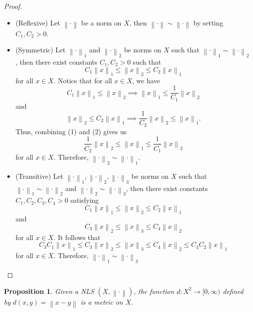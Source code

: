 \documentclass[12pt]{article}
\newtheorem*{proposition}{Proposition}
\newcommand{\lnorm}[2]{\left\lVert#2 \right\rVert_{#1}}
\newcommand{\norm}[1]{\left\lVert#1 \right\rVert}
\begin{document}
\begin{proof} \leavevmode
    \begin{itemize}
        \item (Reflexive) Let $\norm{\cdot}$ be a norm on $X$, then $\norm{\cdot} \sim \norm{\cdot}$ by setting $C_1, C_2 > 0$.
        \item (Symmetric) Let $\lnorm{1}{\cdot}$ and $\lnorm{2}{\cdot}$ be norms on $X$ such that $\lnorm{1}{\cdot} \sim \lnorm{2}{\cdot}$, then there exist constants $C_1, C_2 > 0$ such that 
        $$C_1 \lnorm{1}{x} \leq \lnorm{2}{x} \leq C_2 \lnorm{1}{x}$$
        for all $x \in X$. Notice that for all $x \in X$, we have
        \[C_1 \lnorm{1}{x} \leq \lnorm{2}{x} \implies \lnorm{1}{x} \leq \frac{1}{C_1}\lnorm{2}{x} \tag*{(1)} \]
        and 
        \[\lnorm{2}{x} \leq C_2 \lnorm{1}{x} \implies \frac{1}{C_2}\lnorm{2}{x} \leq \lnorm{1}{x}.\tag*{(2)} \]
        Thus, combining (1) and (2) gives us
        $$\frac{1}{C_2}\lnorm{2}{x} \leq \lnorm{1}{x} \leq \frac{1}{C_1}\lnorm{2}{x}$$
        for all $x \in X$. Therefore, $\lnorm{2}{\cdot} \sim \lnorm{1}{\cdot}$.
        \item (Transitive) Let $\lnorm{1}{\cdot}, \lnorm{2}{\cdot}, \lnorm{3}{\cdot}$ be norms on $X$ such that $\lnorm{1}{\cdot} \sim \lnorm{2}{\cdot}$ and $\lnorm{2}{\cdot} \sim \lnorm{3}{\cdot}$, then there exist constants $C_1, C_2, C_3, C_4 > 0$ satisfying
        $$C_1 \lnorm{1}{x} \leq \lnorm{2}{x} \leq C_2 \lnorm{1}{x}$$
        and 
        $$C_3 \lnorm{2}{x} \leq \lnorm{3}{x} \leq C_4 \lnorm{2}{x}$$
        for all $x \in X$. It follows that
        $$C_3 C_1 \lnorm{1}{x} \leq C_3 \lnorm{2}{x} \leq \lnorm{3}{x} \leq C_4 \lnorm{2}{x} \leq C_4 C_2 \lnorm{1}{x}$$
        for all $x \in X$. Therefore, $\lnorm{1}{\cdot} \sim \lnorm{3}{\cdot}$
    \end{itemize}
\end{proof}

\begin{proposition}
    Given a NLS $(X, \norm{\cdot})$, the function $d : X^2 \to [0, \infty)$ defined by $d(x,y) = \norm{x - y}$ is a metric on $X$.
\end{proposition}
\end{document}
